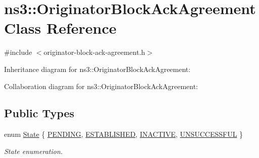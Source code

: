 \hypertarget{classns3_1_1OriginatorBlockAckAgreement}{}\section{ns3\+:\+:Originator\+Block\+Ack\+Agreement Class Reference}
\label{classns3_1_1OriginatorBlockAckAgreement}


{\ttfamily \#include $<$originator-\/block-\/ack-\/agreement.\+h$>$}



Inheritance diagram for ns3\+:\+:Originator\+Block\+Ack\+Agreement\+:


Collaboration diagram for ns3\+:\+:Originator\+Block\+Ack\+Agreement\+:
\subsection*{Public Types}
\begin{DoxyCompactItemize}
\item 
enum \hyperlink{classns3_1_1OriginatorBlockAckAgreement_ab33ae8af8c458aca7437a472778e4761}{State} \{ \hyperlink{classns3_1_1OriginatorBlockAckAgreement_ab33ae8af8c458aca7437a472778e4761a0f8c3879c3167ef79a0d4c57ac6015ff}{P\+E\+N\+D\+I\+NG}, 
\hyperlink{classns3_1_1OriginatorBlockAckAgreement_ab33ae8af8c458aca7437a472778e4761a341f78e1e094b88dea42e94b32871067}{E\+S\+T\+A\+B\+L\+I\+S\+H\+ED}, 
\hyperlink{classns3_1_1OriginatorBlockAckAgreement_ab33ae8af8c458aca7437a472778e4761a57155e6fa589ec94dcd8be08ef6dd837}{I\+N\+A\+C\+T\+I\+VE}, 
\hyperlink{classns3_1_1OriginatorBlockAckAgreement_ab33ae8af8c458aca7437a472778e4761a87f84c6aa88a34abf61f0be8313319ee}{U\+N\+S\+U\+C\+C\+E\+S\+S\+F\+UL}
 \}\begin{DoxyCompactList}\small\item\em State enumeration. \end{DoxyCompactList}
\end{DoxyCompactItemize}
